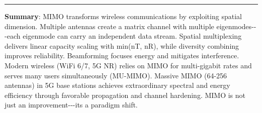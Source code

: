 \begin{center}\rule{0.5\linewidth}{0.5pt}\end{center}

\textbf{Summary}: MIMO transforms wireless communications by exploiting
spatial dimension. Multiple antennas create a matrix channel with
multiple eigenmodes-\/-\/-each eigenmode can carry an independent data
stream. Spatial multiplexing delivers linear capacity scaling with
min(nT, nR), while diversity combining improves reliability. Beamforming
focuses energy and mitigates interference. Modern wireless (WiFi 6/7, 5G
NR) relies on MIMO for multi-gigabit rates and serves many users
simultaneously (MU-MIMO). Massive MIMO (64-256 antennas) in 5G base
stations achieves extraordinary spectral and energy efficiency through
favorable propagation and channel hardening. MIMO is not just an
improvement-\/-\/-it\textquotesingle s a paradigm shift.
